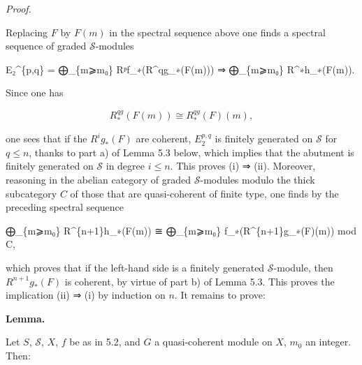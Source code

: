 \documentclass[
  11pt,
  a4paper,
]{book}
\newenvironment{Shaded}{}{}
\newcommand{\NormalTok}[1]{#1}
\begin{document}
\emph{Proof.}

Replacing \(F\) by \(F(m)\) in the spectral sequence above one finds a
spectral sequence of graded \(\mathcal{S}\)-modules

\begin{Shaded}
\begin{Highlighting}[]
\NormalTok{E₂\^{}\{p,q\} = ⨁\_\{m⩾m₀\} Rᵖf\_∗(R\^{}qg\_∗(F(m))) ⇒ ⨁\_\{m⩾m₀\} R\^{}∗h\_∗(F(m)).}
\end{Highlighting}
\end{Shaded}

Since one has

\[ R^{qg}_{\ast}(F(m)) \cong R^{qg}_{\ast}(F)(m), \]

one sees that if the \(R^{i}g_{\ast}(F)\) are coherent, \(E^{p,q}_{2}\)
is finitely generated on \(\mathcal{S}\) for \(q
\leqslant n\), thanks to part a) of Lemma 5.3 below, which implies that
the abutment is finitely generated on \(\mathcal{S}\) in degree
\(i \leqslant n\). This proves (i) ⇒ (ii). Moreover, reasoning in the
abelian category of graded \(\mathcal{S}\)-modules modulo the thick
subcategory \(C\) of those that are quasi-coherent of finite type, one
finds by the preceding spectral sequence

\begin{Shaded}
\begin{Highlighting}[]
\NormalTok{⨁\_\{m⩾m₀\} R\^{}\{n+1\}h\_∗(F(m)) ≅ ⨁\_\{m⩾m₀\} f\_∗(R\^{}\{n+1\}g\_∗(F)(m)) mod C,}
\end{Highlighting}
\end{Shaded}

which proves that if the left-hand side is a finitely generated
\(\mathcal{S}\)-module, then \(R^{n+1}g_{\ast}(F)\) is coherent, by
virtue of part b) of Lemma 5.3. This proves the implication (ii) ⇒ (i)
by induction on \(n\). It remains to prove:

\textbf{Lemma.}

Let \(S\), \(\mathcal{S}\), \(X\), \(f\) be as in 5.2, and \(G\) a
quasi-coherent module on \(X\), \(m_{0}\) an integer. Then:
\end{document}
